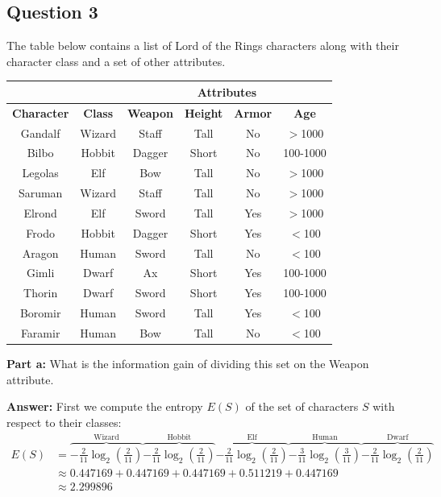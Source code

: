 \documentclass{article}
\begin{document}
\subsection*{Question 3}
The table below contains a list of Lord of the Rings characters along with their character class and a set of other attributes.
\begin{center}
  \begin{tabular}{ c | c | c | c | c | c }
    \toprule
    & & \multicolumn{4}{c}{\textbf{Attributes}} \\ \hline
    \textbf{Character} & \textbf{Class} & \textbf{Weapon} & \textbf{Height} & \textbf{Armor} & \textbf{Age} \\ \hline
    Gandalf & Wizard & Staff & Tall & No & $>$1000 \\ \hline
    Bilbo & Hobbit & Dagger & Short & No & 100-1000 \\ \hline
    Legolas & Elf & Bow & Tall & No & $>$1000 \\ \hline
    Saruman & Wizard & Staff & Tall & No & $>$1000 \\ \hline
    Elrond & Elf & Sword & Tall & Yes & $>$1000 \\ \hline
    Frodo & Hobbit & Dagger & Short & Yes & $<$100 \\ \hline
    Aragon & Human & Sword & Tall & No & $<$100 \\ \hline
    Gimli & Dwarf & Ax & Short & Yes & 100-1000 \\ \hline
    Thorin & Dwarf & Sword & Short & Yes & 100-1000 \\ \hline
    Boromir & Human & Sword & Tall & Yes & $<$100 \\ \hline
    Faramir & Human & Bow & Tall & No & $<$100 \\
    \bottomrule
  \end{tabular}
\end{center}
\bigskip


\noindent\textbf{Part a:} What is the information gain of dividing this set on the Weapon attribute.
\bigskip

\noindent\textbf{Answer:} 
First we compute the entropy $E(S)$ of the set of characters $S$ with respect to their classes:
\begin{align*}
  E(S)&=\overbrace{-\frac{2}{11}\log_2\left(\frac{2}{11}\right)}^{\text{Wizard}}
  \overbrace{-\frac{2}{11}\log_2\left(\frac{2}{11}\right)}^{\text{Hobbit}}
  \overbrace{-\frac{2}{11}\log_2\left(\frac{2}{11}\right)}^{\text{Elf}}
  \overbrace{-\frac{3}{11}\log_2\left(\frac{3}{11}\right)}^{\text{Human}}
  \overbrace{-\frac{2}{11}\log_2\left(\frac{2}{11}\right)}^{\text{Dwarf}}\\
  &\approx0.447169+0.447169+0.447169+0.511219+0.447169\\
  &\approx2.299896
\end{align*}
\end{document}
